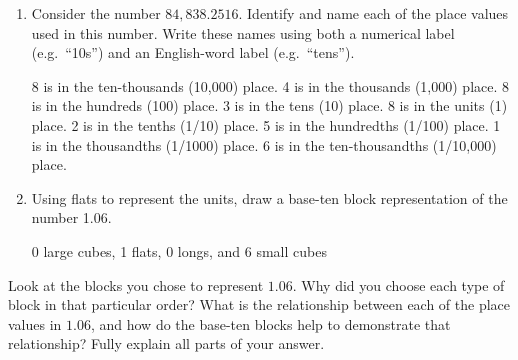 
\begin{enumerate}
    \item Consider the number $84,838.2516$. Identify and name each of the place values used in this number. Write these names using both a numerical label (e.g.\ ``10s'') and an English-word label (e.g.\ ``tens'').

    \vfill
    \begin{ansenv}
        8 is in the ten-thousands (10,000) place.
4 is in the thousands (1,000) place.
8 is in the hundreds (100) place.
3 is in the tens (10) place.
8 is in the units (1) place.
2 is in the tenths (1/10) place.
5 is in the hundredths (1/100) place.
1 is in the thousandths (1/1000) place.
6 is in the ten-thousandths (1/10,000) place.

    \end{ansenv}
    \vfill

    \item Using flats to represent the units, draw a base-ten block representation of the number 1.06.

    \vfill
    \begin{ansenv}
        0 large cubes, 1 flats, 0 longs, and 6 small cubes
    \end{ansenv}
    \vfill
\end{enumerate}

\newpage


Look at the blocks you chose to represent $1.06$. Why did you choose each type of block in that particular order? What is the relationship between each of the place values in $1.06$, and how do the base-ten blocks help to demonstrate that relationship? Fully explain all parts of your answer.